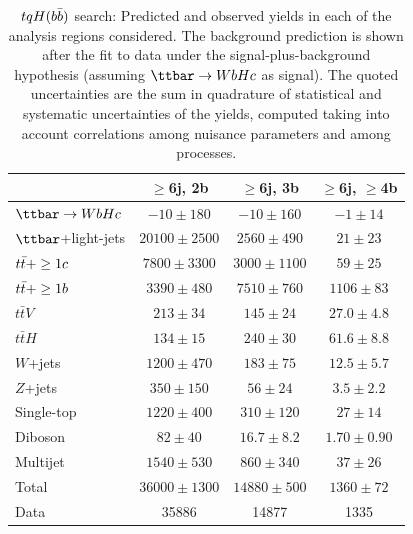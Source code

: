 \begin{table}[htbp]
\begin{center}
\begin{tabular}{l*{3}{c}}
\hline\hline
 & $\geq$6j, 2b & $\geq$6j, 3b & $\geq$6j, $\geq$4b \\
\hline
$\Hc$  &   $ -10 \pm 180 $ &   $ -10 \pm 160 $ &   $ -1 \pm 14 $ \\ 
\hline
$\ttbar$+light-jets  &   $ 20100 \pm 2500 $ &   $ 2560 \pm 490 $ &   $ 21 \pm 23 $ \\ 
$t\bar{t}+\geq1c$  &   $ 7800 \pm 3300 $ &   $ 3000 \pm 1100 $ &   $ 59 \pm 25 $ \\ 
$t\bar{t}+\geq1b$  &   $ 3390 \pm 480 $ &   $ 7510 \pm 760 $ &   $ 1106 \pm 83 $ \\ 
$t\bar{t}V$  &   $ 213 \pm 34 $ &   $ 145 \pm 24 $ &   $ 27.0 \pm 4.8 $ \\ 
$t\bar{t}H$  &   $ 134 \pm 15 $ &   $ 240 \pm 30 $ &   $ 61.6 \pm 8.8 $ \\ 
$W$+jets  &   $ 1200 \pm 470 $ &   $ 183 \pm 75 $ &   $ 12.5 \pm 5.7 $ \\ 
$Z$+jets  &   $ 350 \pm 150 $ &   $ 56 \pm 24 $ &   $ 3.5 \pm 2.2 $ \\ 
Single-top  &   $ 1220 \pm 400 $ &   $ 310 \pm 120 $ &   $ 27 \pm 14 $ \\ 
Diboson  &   $ 82 \pm 40 $ &   $ 16.7 \pm 8.2 $ &   $ 1.70 \pm 0.90 $ \\ 
Multijet  &   $ 1540 \pm 530 $ &   $ 860 \pm 340 $ &   $ 37 \pm 26 $ \\ 
\hline
Total &   $ 36000 \pm 1300 $ &   $ 14880 \pm 500 $ &   $ 1360 \pm 72 $ \\ 
\hline
Data & 35886  & 14877  & 1335  \\
\hline\hline      
\end{tabular}

%
\end{center}
\caption{
$tqH(b\bar{b})$ search: Predicted and observed yields in each of the analysis regions considered.
The background prediction is shown after the fit to data under the signal-plus-background hypothesis 
(assuming $\Hc$ as signal).
The quoted uncertainties are the sum in quadrature of statistical and systematic uncertainties of the yields, 
computed taking into account correlations among nuisance parameters and among processes.
}
\label{tab:Hbb_Postfit_Yields_Unblind_Hc}
\end{table}

